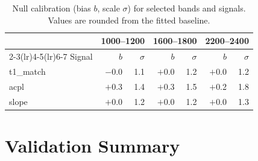 \documentclass[11pt,a4paper]{article}
\theoremstyle{definition}
\begin{document}
\begin{table}[h!]
  \centering
  \caption{Null calibration (bias $b$, scale $\sigma$) for selected
    bands and signals.  Values are rounded from the fitted baseline.}
  \label{tab:bandcalib}
  \smallskip
  \small
  \begin{tabular}{@{}l rr rr rr@{}}
    \toprule
    & \multicolumn{2}{c}{1000--1200} & \multicolumn{2}{c}{1600--1800}
    & \multicolumn{2}{c}{2200--2400} \\
    \cmidrule(lr){2-3}\cmidrule(lr){4-5}\cmidrule(lr){6-7}
    Signal & $b$ & $\sigma$ & $b$ & $\sigma$ & $b$ & $\sigma$ \\
    \midrule
    t1\_match & $-$0.0 & 1.1 & $+$0.0 & 1.2
              & $+$0.0 & 1.2 \\
    acpl      & $+$0.3 & 1.4 & $+$0.3 & 1.5
              & $+$0.2 & 1.8 \\
    slope     & $+$0.0 & 1.2 & $+$0.0 & 1.2
              & $+$0.0 & 1.3 \\
    \bottomrule
  \end{tabular}
\end{table}


\section{Validation Summary}
\label{app:validation}
\end{document}
